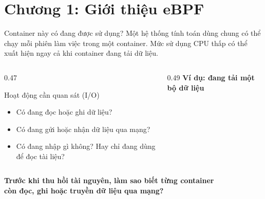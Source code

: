 \section{Chương 1: Giới thiệu eBPF}

\begin{frame}{Container này có đang được sử dụng?}
  \small
  Một hệ thống tính toán dùng chung có thể chạy mỗi phiên làm việc trong một container.
  Mức sử dụng CPU thấp có thể xuất hiện ngay cả khi container đang tải dữ liệu.
  \vspace{0.35cm}
  \begin{columns}[c,onlytextwidth]
    \begin{column}{0.47\textwidth}
      \begin{block}{Hoạt động cần quan sát (I/O)}
        \begin{itemize}
          \item Có đang đọc hoặc ghi dữ liệu?
          \item Có đang gửi hoặc nhận dữ liệu qua mạng?
          \item Có đang nhập gì không? Hay chỉ đang dùng để đọc tài liệu?
        \end{itemize}
      \end{block}
    \end{column}
    \begin{column}{0.49\textwidth}
      \centering
      \textbf{Ví dụ: đang tải một bộ dữ liệu}\par\medskip
    \end{column}
  \end{columns}
  \vspace{0.35cm}
  \centering\textbf{Trước khi thu hồi tài nguyên, làm sao biết từng container\\
    còn đọc, ghi hoặc truyền dữ liệu qua mạng?}
\end{frame}

